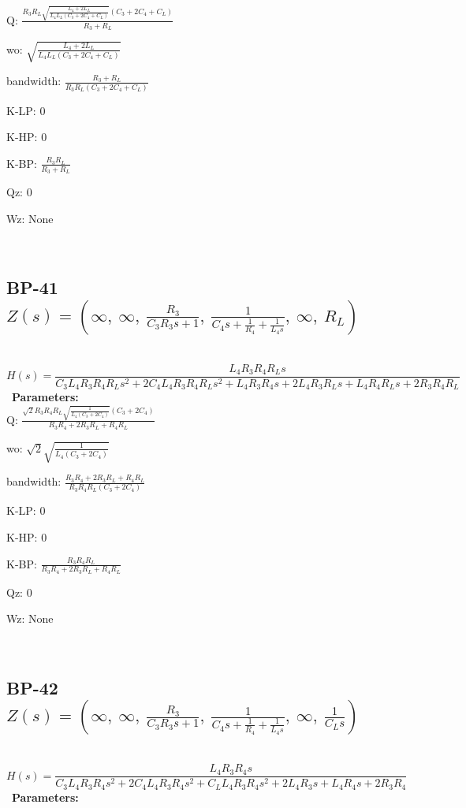 \documentclass{article}
\begin{document}
Q: $\frac{R_{3} R_{L} \sqrt{\frac{L_{4} + 2 L_{L}}{L_{4} L_{L} \left(C_{3} + 2 C_{4} + C_{L}\right)}} \left(C_{3} + 2 C_{4} + C_{L}\right)}{R_{3} + R_{L}}$\ 

wo: $\sqrt{\frac{L_{4} + 2 L_{L}}{L_{4} L_{L} \left(C_{3} + 2 C_{4} + C_{L}\right)}}$\ 

bandwidth: $\frac{R_{3} + R_{L}}{R_{3} R_{L} \left(C_{3} + 2 C_{4} + C_{L}\right)}$\ 

K-LP: $0$\ 

K-HP: $0$\ 

K-BP: $\frac{R_{3} R_{L}}{R_{3} + R_{L}}$\ 

Qz: $0$\ 

Wz: $\text{None}$\ 

\ 

\subsection{BP-41 $Z(s) = \left( \infty, \  \infty, \  \frac{R_{3}}{C_{3} R_{3} s + 1}, \  \frac{1}{C_{4} s + \frac{1}{R_{4}} + \frac{1}{L_{4} s}}, \  \infty, \  R_{L}\right)$ } \ 
\textbf{\[H(s) = \frac{L_{4} R_{3} R_{4} R_{L} s}{C_{3} L_{4} R_{3} R_{4} R_{L} s^{2} + 2 C_{4} L_{4} R_{3} R_{4} R_{L} s^{2} + L_{4} R_{3} R_{4} s + 2 L_{4} R_{3} R_{L} s + L_{4} R_{4} R_{L} s + 2 R_{3} R_{4} R_{L}}\] } \ 
\textbf{Parameters:}\\ 

Q: $\frac{\sqrt{2} R_{3} R_{4} R_{L} \sqrt{\frac{1}{L_{4} \left(C_{3} + 2 C_{4}\right)}} \left(C_{3} + 2 C_{4}\right)}{R_{3} R_{4} + 2 R_{3} R_{L} + R_{4} R_{L}}$\ 

wo: $\sqrt{2} \sqrt{\frac{1}{L_{4} \left(C_{3} + 2 C_{4}\right)}}$\ 

bandwidth: $\frac{R_{3} R_{4} + 2 R_{3} R_{L} + R_{4} R_{L}}{R_{3} R_{4} R_{L} \left(C_{3} + 2 C_{4}\right)}$\ 

K-LP: $0$\ 

K-HP: $0$\ 

K-BP: $\frac{R_{3} R_{4} R_{L}}{R_{3} R_{4} + 2 R_{3} R_{L} + R_{4} R_{L}}$\ 

Qz: $0$\ 

Wz: $\text{None}$\ 

\ 

\subsection{BP-42 $Z(s) = \left( \infty, \  \infty, \  \frac{R_{3}}{C_{3} R_{3} s + 1}, \  \frac{1}{C_{4} s + \frac{1}{R_{4}} + \frac{1}{L_{4} s}}, \  \infty, \  \frac{1}{C_{L} s}\right)$ } \ 
\textbf{\[H(s) = \frac{L_{4} R_{3} R_{4} s}{C_{3} L_{4} R_{3} R_{4} s^{2} + 2 C_{4} L_{4} R_{3} R_{4} s^{2} + C_{L} L_{4} R_{3} R_{4} s^{2} + 2 L_{4} R_{3} s + L_{4} R_{4} s + 2 R_{3} R_{4}}\] } \ 
\textbf{Parameters:}\\ 
\end{document}
